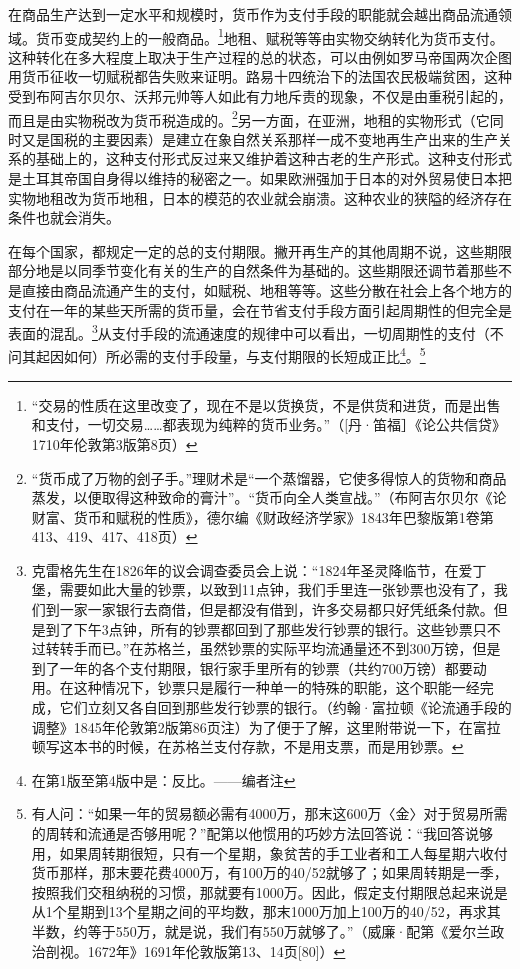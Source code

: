 \documentclass{ctexbook}
\begin{document}
        在商品生产达到一定水平和规模时，货币作为支付手段的职能就会越出商品流通领域。货币变成契约上的一般商品。\footnote{“交易的性质在这里改变了，现在不是以货换货，不是供货和进货，而是出售和支付，一切交易……都表现为纯粹的货币业务。”（[丹·笛福］《论公共信贷》1710年伦敦第3版第8页）}地租、赋税等等由实物交纳转化为货币支付。这种转化在多大程度上取决于生产过程的总的状态，可以由例如罗马帝国两次企图用货币征收一切赋税都告失败来证明。路易十四统治下的法国农民极端贫困，这种受到布阿吉尔贝尔、沃邦元帅等人如此有力地斥责的现象，不仅是由重税引起的，而且是由实物税改为货币税造成的。\footnote{“货币成了万物的刽子手。”理财术是“一个蒸馏器，它使多得惊人的货物和商品蒸发，以便取得这种致命的膏汁”。“货币向全人类宣战。”（布阿吉尔贝尔《论财富、货币和赋税的性质》，德尔编《财政经济学家》1843年巴黎版第1卷第413、419、417、418页）}另一方面，在亚洲，地租的实物形式（它同时又是国税的主要因素）是建立在象自然关系那样一成不变地再生产出来的生产关系的基础上的，这种支付形式反过来又维护着这种古老的生产形式。这种支付形式是土耳其帝国自身得以维持的秘密之一。如果欧洲强加于日本的对外贸易使日本把实物地租改为货币地租，日本的模范的农业就会崩溃。这种农业的狭隘的经济存在条件也就会消失。

        在每个国家，都规定一定的总的支付期限。撇开再生产的其他周期不说，这些期限部分地是以同季节变化有关的生产的自然条件为基础的。这些期限还调节着那些不是直接由商品流通产生的支付，如赋税、地租等等。这些分散在社会上各个地方的支付在一年的某些天所需的货币量，会在节省支付手段方面引起周期性的但完全是表面的混乱。\footnote{克雷格先生在1826年的议会调查委员会上说：“1824年圣灵降临节，在爱丁堡，需要如此大量的钞票，以致到11点钟，我们手里连一张钞票也没有了，我们到一家一家银行去商借，但是都没有借到，许多交易都只好凭纸条付款。但是到了下午3点钟，所有的钞票都回到了那些发行钞票的银行。这些钞票只不过转转手而已。”在苏格兰，虽然钞票的实际平均流通量还不到300万镑，但是到了一年的各个支付期限，银行家手里所有的钞票（共约700万镑）都要动用。在这种情况下，钞票只是履行一种单一的特殊的职能，这个职能一经完成，它们立刻又各自回到那些发行钞票的银行。（约翰·富拉顿《论流通手段的调整》1845年伦敦第2版第86页注）为了便于了解，这里附带说一下，在富拉顿写这本书的时候，在苏格兰支付存款，不是用支票，而是用钞票。}从支付手段的流通速度的规律中可以看出，一切周期性的支付（不问其起因如何）所必需的支付手段量，与支付期限的长短成正比\footnote{在第1版至第4版中是：反比。——编者注}。\footnote{有人问：“如果一年的贸易额必需有4000万，那末这600万〈金〉对于贸易所需的周转和流通是否够用呢？”配第以他惯用的巧妙方法回答说：“我回答说够用，如果周转期很短，只有一个星期，象贫苦的手工业者和工人每星期六收付货币那样，那末要花费4000万，有100万的40/52就够了；如果周转期是一季，按照我们交租纳税的习惯，那就要有1000万。因此，假定支付期限总起来说是从1个星期到13个星期之间的平均数，那末1000万加上100万的40/52，再求其半数，约等于550万，就是说，我们有550万就够了。”（威廉·配第《爱尔兰政治剖视。1672年》1691年伦敦版第13、14页[80]）}
\end{document}
